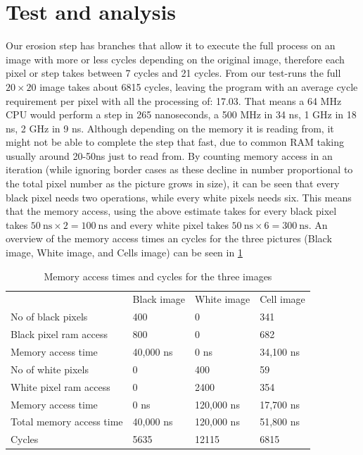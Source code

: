 \documentclass[a4paper, english]{article}
\numberwithin{equation}{section}
\begin{document}
\section{Test and analysis}\label{sec:test}
Our erosion step has branches that allow it to execute the full process on an image with more or less cycles depending on the original image, therefore each pixel or step takes between 7 cycles and 21 cycles. From our test-runs the full \(20 \times 20\) image takes about 6815 cycles, leaving the program with an average cycle requirement per pixel with all the processing of: 17.03. That means a 64 MHz CPU would perform a step in 265 nanoseconds, a 500 MHz in 34 ns, 1 GHz in 18 ns, 2 GHz in 9 ns. Although depending on the memory it is reading from, it might not be able to complete the step that fast, due to common RAM taking usually around 20-50ns just to read from.\newline
By counting memory access in an iteration (while ignoring border cases as these decline in number proportional to the total pixel number as the picture grows in size), it can be seen that every black pixel needs two operations, while every white pixels needs six. This means that the memory access, using the above estimate takes for every black pixel takes \(\SI{50}{\nano\second} \times 2 = \SI{100}{\nano\second}\) and every white pixel takes \(\SI{50}{\nano\second} \times 6 = \SI{300}{\nano\second}\). An overview of the memory access times an cycles for the three pictures (Black image, White image, and Cells image) can be seen in \cref{tbl:memacccycl}
\begin{table}[H]
\centering
\caption{Memory access times and cycles for the three images}\label{tbl:memacccycl}
\begin{tabular}{llll}
\toprule
 & Black image & White image & Cell image \\
 No of black pixels & 400 &0 &341\\
 Black pixel ram access & 800 & 0&682\\
 Memory access time & 40,000 ns & 0 ns & 34,100 ns \\
 \midrule
 No of white pixels & 0 & 400&59\\
 White pixel ram access & 0 & 2400& 354 \\
 Memory access time & 0 ns & 120,000 ns & 17,700 ns\\
 \midrule
 Total memory access time & 40,000 ns & 120,000 ns & 51,800 ns\\
 Cycles & 5635 & 12115&6815\\
\bottomrule
\end{tabular}
\end{table}
\end{document}

